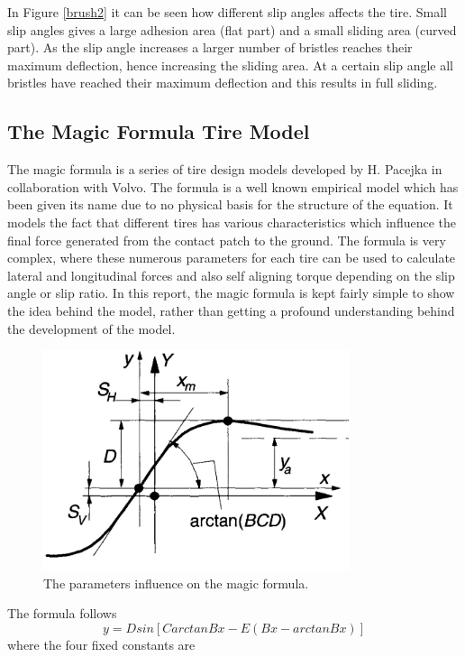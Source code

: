 In Figure \ref{brush2} it can be seen how different slip angles affects the tire. Small slip angles gives a large adhesion area (flat part) and a small sliding area (curved part). As the slip angle increases a larger number of bristles reaches their maximum deflection, hence increasing the sliding area. At a certain slip angle all bristles have reached their maximum deflection and this results in full sliding. 

\subsection{The Magic Formula Tire Model}

The magic formula is a series of tire design models developed by H. Pacejka \cite{pacejka} in collaboration with Volvo. The formula is a well known empirical model which has been given its name due to no physical basis for the structure of the equation. It models the fact that different tires has various characteristics which influence the final force generated from the contact patch to the ground. The formula is very complex, where these numerous parameters for each tire can be used to calculate lateral and longitudinal forces and also self aligning torque depending on the slip angle or slip ratio. In this report, the magic formula is kept fairly simple to show the idea behind the model, rather than getting a profound understanding behind the development of the model.


\begin{figure}[h]
	\centering
	\includegraphics[width=0.8\textwidth]{Pictures/magic_formula}
	\caption{The parameters influence on the magic formula. \cite{pacejka}}
	\label{magic_formula}
\end{figure}

The formula follows
\begin{equation}
	y = Dsin[CarctanBx-E(Bx-arctanBx)]
\end{equation}
where the four fixed constants are

